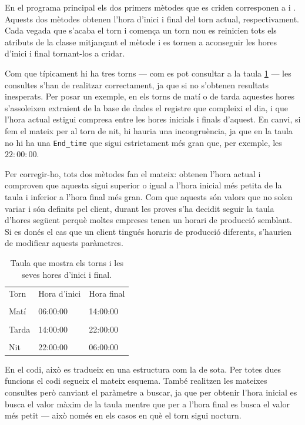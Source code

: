 \documentclass{tfgitic}[2022/06/30]
\begin{document}
En el programa principal els dos primers mètodes que es criden corresponen a  i . Aquests dos mètodes obtenen l'hora d'inici i final del torn actual, respectivament. Cada vegada que s'acaba el torn i comença un torn nou es reinicien tots els atributs de la classe mitjançant el mètode  i es tornen a aconseguir les hores d'inici i final tornant-los a cridar.

Com que típicament hi ha tres torns --- com es pot consultar a la taula \ref{table:torns} --- les consultes s'han de realitzar correctament, ja que si no s'obtenen resultats inesperats. Per posar un exemple, en els torns de matí o de tarda aquestes hores s'assoleixen extraient de la base de dades el registre que compleixi el dia, i que l'hora actual estigui compresa entre les hores inicials i finals d'aquest. En canvi, si fem el mateix per al torn de nit, hi hauria una incongruència, ja que en la taula no hi ha una \texttt{End\_time} que sigui estrictament més gran que, per exemple, les $22:00:00$.

Per corregir-ho, tots dos mètodes fan el mateix: obtenen l'hora actual i comproven que aquesta sigui superior o igual a l'hora inicial més petita de la taula i inferior a l'hora final més gran. Com que aquests són valors que no solen variar i són definits pel client, durant les proves s'ha decidit seguir la taula d'hores següent perquè moltes empreses tenen un horari de producció semblant. Si es donés el cas que un client tingués horaris de producció diferents, s'haurien de modificar aquests paràmetres.

\begin{table}[h]
\centering
\begin{tabular}{
>{\columncolor[HTML]{EBEAEA}}lll}
\cellcolor[HTML]{D3D3D3} Torn & \cellcolor[HTML]{D3D3D3} Hora d'inici & \cellcolor[HTML]{D3D3D3} Hora final\\
\\
Matí & 06:00:00 & 14:00:00\\
\\
Tarda & 14:00:00 & 22:00:00\\
\\
Nit & 22:00:00 & 06:00:00
\end{tabular}
\caption{Taula que mostra els torns i les seves hores d'inici i final.}
\label{table:torns}
\end{table}

En el codi, això es tradueix en una estructura com la de sota. Per totes dues funcions el codi segueix el mateix esquema. També realitzen les mateixes consultes però canviant el paràmetre a buscar, ja que per obtenir l'hora inicial es busca el valor màxim de la taula mentre que per a l'hora final es busca el valor més petit --- això només en els casos en què el torn sigui nocturn.
\end{document}
